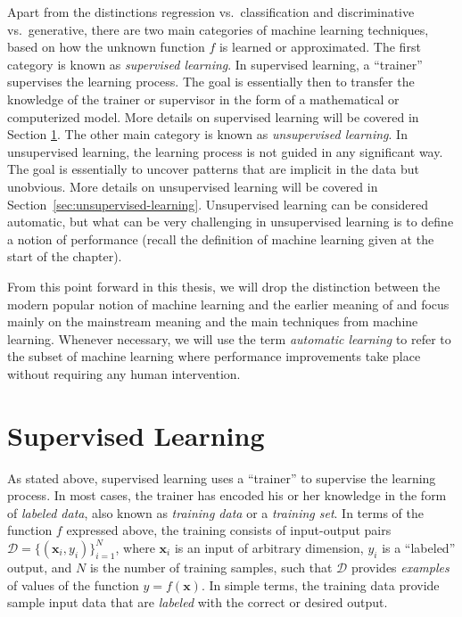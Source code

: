 Apart from the distinctions regression vs.\ classification and discriminative vs.\ generative, there are two main categories of machine learning techniques, based on how the unknown function $f$ is learned or approximated. The first category is known as \emph{supervised learning}. In supervised learning, a ``trainer'' supervises the learning process. The goal is essentially then to transfer the knowledge of the trainer or supervisor in the form of a mathematical or computerized model. More details on supervised learning will be covered in Section \ref{sec:supervised-learning}. The other main category is known as \emph{unsupervised learning}. In unsupervised learning, the learning process is not guided in any significant way. The goal is essentially to uncover patterns that are implicit in the data but unobvious.   More details on unsupervised learning will be covered in Section~\ref{sec:unsupervised-learning}. Unsupervised learning can be considered automatic, but what can be very challenging in unsupervised learning is to define a notion of performance (recall the definition of machine learning given at the start of the chapter).

From this point forward in this thesis, we will drop the distinction between the modern popular notion of machine learning and the earlier meaning of \cite{Mitchell1990} and focus mainly on the mainstream meaning and the main techniques from machine learning. Whenever necessary, we will use the term \emph{automatic learning} to refer to the subset of machine learning where performance improvements take place without requiring any human intervention.
%
\section{Supervised Learning}
\label{sec:supervised-learning}
%
As stated above, supervised learning uses a ``trainer'' to supervise the learning process. In most cases, the trainer has encoded his or her knowledge in the form of \emph{labeled data}, also known as \emph{training data} or a \emph{training set}. In terms of the function $f$ expressed above, the training consists of input-output pairs $\mathcal{D} = \{(\mathbf{x}_i, y_i)\}_{i=1}^N $, where $\mathbf{x}_i$ is an input of arbitrary dimension, $y_i$ is a ``labeled'' output, and $N$ is the number of training samples, such that $\mathcal{D}$ provides \emph{examples} of values of the function $y = f(\mathbf{x})$. In simple terms, the training data provide sample input data that are \emph{labeled} with the correct or desired output.

